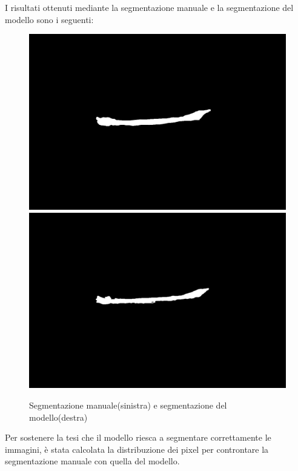 I risultati ottenuti mediante la segmentazione manuale e la segmentazione del modello sono i seguenti:
\begin{figure}[!ht]
	\begin{adjustbox}{width=0.9\columnwidth, center}
    \includegraphics{./images/mask.png}
    \hspace{20pt} %
    \includegraphics{./images/prediction.png}
  \end{adjustbox}
  \caption{Segmentazione manuale(sinistra) e segmentazione del modello(destra)}
  \label{fig:segmentazione manuale e segmentazione del modello}
\end{figure}


Per sostenere la tesi che il modello riesca a segmentare correttamente le immagini, \`e stata 
calcolata la distribuzione dei pixel per controntare la segmentazione manuale con quella del modello.


